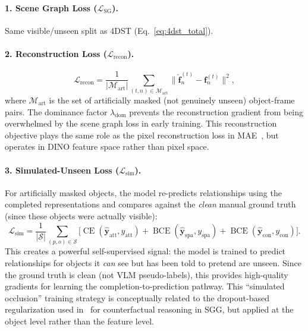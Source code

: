 \documentclass[runningheads]{llncs}
\newcommand{\op}[1]{\operatorname{#1}}
\newcommand{\mat}[1]{\bm{#1}}
\begin{document}
\paragraph{1. Scene Graph Loss ($\mathcal{L}_{\text{SG}}$).}  Same visible/unseen split as 4DST (Eq.~\ref{eq:4dst_total}).

\paragraph{2. Reconstruction Loss ($\mathcal{L}_{\text{recon}}$).}
\begin{equation}
    \mathcal{L}_{\text{recon}} = \frac{1}{|\mathcal{M}_{\text{art}}|}\sum_{(t,n) \in \mathcal{M}_{\text{art}}} \|\hat{\mat{f}}_n^{(t)} - \mat{f}_n^{(t)}\|^2,
    \label{eq:recon_loss}
\end{equation}
where $\mathcal{M}_{\text{art}}$ is the set of artificially masked (not genuinely unseen) object-frame pairs.  The dominance factor $\lambda_{\text{dom}}$ prevents the reconstruction gradient from being overwhelmed by the scene graph loss in early training.  This reconstruction objective plays the same role as the pixel reconstruction loss in MAE~\cite{he2022masked}, but operates in DINO feature space rather than pixel space.

\paragraph{3. Simulated-Unseen Loss ($\mathcal{L}_{\text{sim}}$).}
For artificially masked objects, the model re-predicts relationships using the completed representations and compares against the \emph{clean} manual ground truth (since these objects were actually visible):
\begin{equation}
    \mathcal{L}_{\text{sim}} = \frac{1}{|\mathcal{S}|}\sum_{(p,o) \in \mathcal{S}} \bigl[\op{CE}(\hat{\mat{y}}_{\text{att}}, y_{\text{att}}) + \op{BCE}(\hat{\mat{y}}_{\text{spa}}, y_{\text{spa}}) + \op{BCE}(\hat{\mat{y}}_{\text{con}}, y_{\text{con}})\bigr].
    \label{eq:sim_loss}
\end{equation}
This creates a powerful self-supervised signal: the model is trained to predict relationships for objects it \emph{can} see but has been told to pretend are unseen.  Since the ground truth is clean (not VLM pseudo-labels), this provides high-quality gradients for learning the completion-to-prediction pathway.  This ``simulated occlusion'' training strategy is conceptually related to the dropout-based regularization used in~\cite{chen2019counterfactual} for counterfactual reasoning in SGG, but applied at the object level rather than the feature level.
\end{document}
